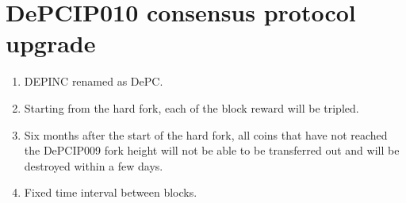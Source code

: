 \chapter{DePCIP010 consensus protocol upgrade}
\begin{flushleft}
   \begin{enumerate}
       \item DEPINC renamed as DePC.
       \item Starting from the hard fork, each of the block reward will be tripled.
       \item Six months after the start of the hard fork, all coins that have not reached the DePCIP009 fork height will not be able to be transferred out and will be destroyed within a few days.
       \item Fixed time interval between blocks.
   \end{enumerate}
\end{flushleft}
